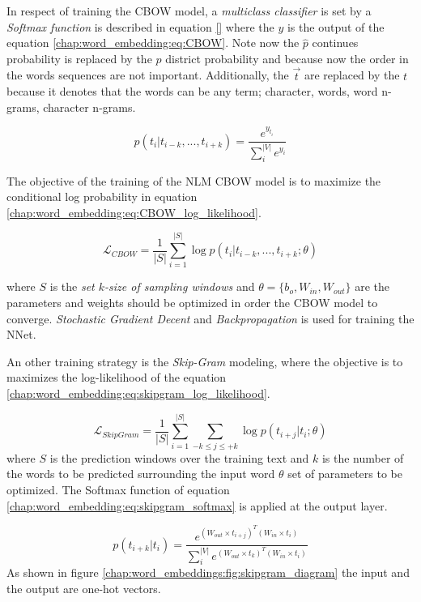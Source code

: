 In respect of training the CBOW model, a \textit{multiclass classifier} is set by a \textit{Softmax function} is described in equation \ref{} where the $y$ is the output of the equation \ref{chap:word_embedding:eq:CBOW}. Note now the $\hat{p}$ continues probability is replaced by the $p$ district probability and because now the order in the words sequences are not important. Additionally, the $\vec{t}$ are replaced by the $t$ because it denotes that the words can be any term; character, words, word n-grams, character n-grams. 

\begin{equation} \label{chap:word_embedding:eq:CBOW_softmax}
	p(t_{i}|t_{i-k},...,t_{i+k}) = \frac{e^{y_{t_{i}}}}{\sum^{|V|}_{i}{e^{y_i}}}
\end{equation}

The objective of the training of the NLM CBOW model is to maximize the conditional log probability in equation \ref{chap:word_embedding:eq:CBOW_log_likelihood}. 

\begin{equation} \label{chap:word_embedding:eq:CBOW_log_likelihood}
	 \mathcal{L}_{CBOW} = \frac{1}{|S|} \sum_{i=1}^{|S|}{\log{p(t_{i}|t_{i-k}, ... ,t_{i+k};\theta)}}
\end{equation}


\noindent
where $S$ is the \textit{set $k$-size of sampling windows} and  $\theta=\{b_{o},W_{in},W_{out}\}$ are the parameters and weights should be optimized in order the CBOW model to converge. \textit{Stochastic Gradient Decent} and \textit{Backpropagation} is used for training the NNet.

An other training strategy is the \textit{Skip-Gram} modeling, where the objective is to maximizes the log-likelihood of the equation \ref{chap:word_embedding:eq:skipgram_log_likelihood}.

\begin{equation} \label{chap:word_embedding:eq:skipgram_log_likelihood}
	 \mathcal{L}_{SkipGram} = \frac{1}{|S|} \sum_{i=1}^{|S|}{ \sum_{-k \leq j \leq +k}{ \log {p(t_{i+j}|t_{i};\theta)}  } }
\end{equation}
\noindent
where $S$ is the prediction windows over the training text and $k$ is the number of the words to be predicted surrounding the input word $\theta$ set of parameters to be optimized. The Softmax function of equation \ref{chap:word_embedding:eq:skipgram_softmax} is applied at the output layer.

\begin{equation} \label{chap:word_embedding:eq:skipgram_softmax}
	p(t_{i+k}|t_{i}) = \frac{ e^{(W_{out}  \times  t_{i+j})^{T} (W_{in} \times  t_{i})}}{\sum^{|V|}_{i}{ e^{(W_{out}  \times  t_{k})^{T} (W_{in} \times  t_{i})}}} 
\end{equation}
As shown in figure \ref{chap:word_embeddings:fig:skipgram_diagram} the input and the output are one-hot vectors.

